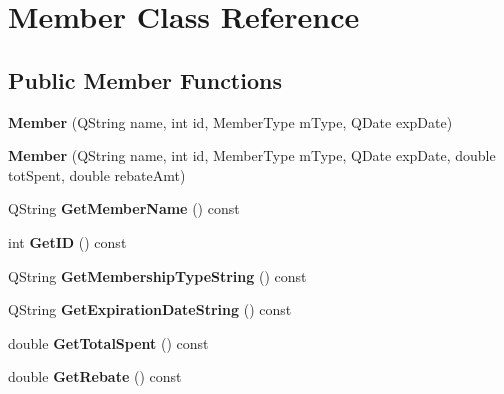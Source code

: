 \hypertarget{class_member}{}\section{Member Class Reference}
\label{class_member}
\subsection*{Public Member Functions}
\begin{DoxyCompactItemize}
\item 
\mbox{\label{class_member_a92d505b92f58ef6bee3599677eee51a5}} 
{\bfseries Member} (Q\+String name, int id, Member\+Type m\+Type, Q\+Date exp\+Date)
\item 
\mbox{\label{class_member_a317912a29e377858dfae8873ac5a77ff}} 
{\bfseries Member} (Q\+String name, int id, Member\+Type m\+Type, Q\+Date exp\+Date, double tot\+Spent, double rebate\+Amt)
\item 
\mbox{\label{class_member_aaba370b742cfe75151f5da331b9c677f}} 
Q\+String {\bfseries Get\+Member\+Name} () const
\item 
\mbox{\label{class_member_aba8f296b62f2df8b19b29eab240f1f09}} 
int {\bfseries Get\+ID} () const
\item 
\mbox{\label{class_member_a36f70bd1a8b4b1f7fbc22b9369e1ca38}} 
Q\+String {\bfseries Get\+Membership\+Type\+String} () const
\item 
\mbox{\label{class_member_aca64d3629776abdac055ae0140021aa3}} 
Q\+String {\bfseries Get\+Expiration\+Date\+String} () const
\item 
\mbox{\label{class_member_a19cb2fa14badadbd3eb5eea4f94179d4}} 
double {\bfseries Get\+Total\+Spent} () const
\item 
\mbox{\label{class_member_adf6de50fe7517be7cd2a009bffc615b5}} 
double {\bfseries Get\+Rebate} () const
\end{DoxyCompactItemize}
